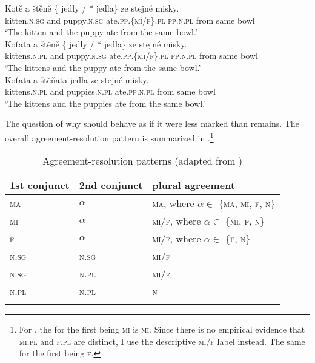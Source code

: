\documentclass[output=paper,modfontsnewtxmath,hidelinks]{langscibook}
\begin{document}
\ea\label{neuter}
\ea\gll Kotě a štěně \{\hspace{-2pt} jedly / *\hspace{-2pt} jedla\} ze stejné misky.\label{n-a}\\
kitten.\textsc{n.sg} and puppy.\textsc{n.sg} {} ate.\textsc{pp.\{mi/f\}.pl} {} {} \textsc{pp.n.pl} from same bowl\\
\glt `The kitten and the puppy  ate from the same bowl.'\\\hfill {}\smallskip
\ex\gll Koťata a štěně \{\hspace{-2pt} jedly / *\hspace{-2pt} jedla\} ze stejné misky.\label{n-b}\\
kittens.\textsc{n.pl} and puppy.\textsc{n.sg} {} ate.\textsc{pp.\{mi/f\}.pl} {} {} \textsc{pp.n.pl} from same bowl\\
\glt `The kittens and the puppy  ate from the same bowl.'\\\hfill {}\smallskip
\ex\gll Koťata a štěňata jedla ze stejné misky.\label{n-c}\\
kittens.\textsc{n.pl} and puppies.\textsc{n.pl} ate.\textsc{pp.n.pl} from same bowl\label{n-pl}\\
\glt `The kittens and the puppies  ate from the same bowl.'\\\hfill {}
\z\z

\noindent The question of why   should behave as if it were less marked than   remains. The overall agreement-resolution pattern is summarized in .\footnote{For \citet{Panevova1997}, the  for the first  being \textsc{mi} is \textsc{mi}. Since there is no empirical evidence that \textsc{mi.pl} and \textsc{f.pl} are distinct, I use the descriptive \textsc{mi/f} label instead. The same for the first  being \textsc{f}.}

\begin{table}
\caption{Agreement-resolution patterns (adapted from \citealt{Panevova1997})}
\label{PPtable}
\begin{tabularx}{0.8\textwidth}{llX}
\lsptoprule
\textbf{1st conjunct} & \textbf{2nd conjunct} & \textbf{{plural} agreement} \\\midrule
\textsc{ma} & $\alpha$ & \textsc{ma}, where $\alpha \in$ \{\textsc{ma, mi, f, n}\}\\
\textsc{mi} & $\alpha$ & \textsc{mi/f}, where $\alpha \in$ \{\textsc{mi, f, n}\}\\
\textsc{f} & $\alpha$ & \textsc{mi/f}, where $\alpha \in$ \{\textsc{f, n}\}\\
\textsc{n.sg} & \textsc{n.sg} & \textsc{mi/f}\\
\textsc{n.sg} & \textsc{n.pl} & \textsc{mi/f}\\
\textsc{n.pl} & \textsc{n.pl} & \textsc{n}\\\lspbottomrule
\end{tabularx}
\end{table}
\end{document}
